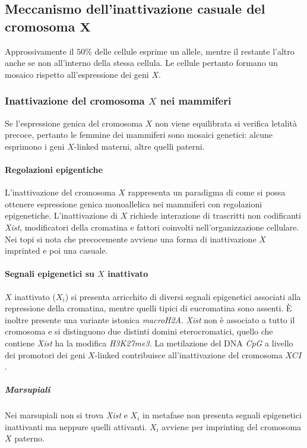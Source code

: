 	\subsection{Meccanismo dell'inattivazione casuale del cromosoma $\mathbf{X}$}
	Approssivamente il $50\%$ delle cellule esprime un allele, mentre il restante l'altro anche se non all'interno della stessa cellula.
	Le cellule pertanto formano un mosaico rispetto all'espressione dei geni $X$.

		\subsubsection{Inattivazione del cromosoma $X$ nei mammiferi}
		Se l'espressione genica del cromosoma $X$ non viene equilibrata si verifica letalit\`a precoce, pertanto le femmine dei mammiferi sono mosaici genetici: alcune esprimono i geni $X$-linked materni, altre quelli paterni.

			\paragraph{Regolazioni epigentiche}
			L'inattivazione del cromosoma $X$ rappresenta un paradigma di come si possa ottenere espressione genica monoallelica nei mammiferi con regolazioni epigenetiche.
			L'inattivazione di $X$ richiede interazione di trascritti non codificanti \emph{Xist}, modificatori della cromatina e fattori coinvolti nell'organizzazione cellulare.
			Nei topi si nota che precocemente avviene una forma di inattivazione $X$ imprinted e poi una casuale.

			\paragraph{Segnali epigenetici su $X$ inattivato}
			$X$ inattivato ($X_i$) si presenta arricchito di diversi segnali epigenetici associati alla repressione della cromatina, mentre quelli tipici di eucromatina sono assenti.
			\`E inoltre presente una variante istonica \emph{macroH2A}.
			\emph{Xist} non \`e associato a tutto il cromosoma e si distinguono due distinti domini eterocromatici, quello che contiene \emph{Xist} ha la modifica \emph{H3K27me3}.
			La metilazione del DNA \emph{CpG} a livello dei promotori dei geni $X$-linked contribuisce all'inattivazione del cromosoma $XCI$.

				\subparagraph{Marsupiali}
				Nei marsupiali non si trova \emph{Xist} e $X_i$ in metafase non presenta segnali epigenetici inattivanti ma neppure quelli attivanti.
				$X_i$ avviene per imprinting del cromosoma $X$ paterno.


